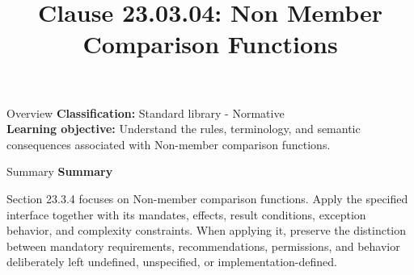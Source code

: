 \documentclass[10pt,letterpaper]{article}
\title{Clause 23.03.04: Non Member Comparison Functions}
\author{}
\date{}
\begin{document}
\maketitle
\begin{CornellOverviewBox}{Overview}
\textbf{Classification:} Standard library - Normative\\[2pt]
\textbf{Learning objective:} Understand the rules, terminology, and semantic consequences associated with Non-member comparison functions.
\end{CornellOverviewBox}\begin{CornellSummaryBox}{Summary}
{\sffamily\bfseries\color{Accent} Summary}\par\vspace{3pt}Section 23.3.4 focuses on Non-member comparison functions. Apply the specified interface together with its mandates, effects, result conditions, exception behavior, and complexity constraints. When applying it, preserve the distinction between mandatory requirements, recommendations, permissions, and behavior deliberately left undefined, unspecified, or implementation-defined.
\end{CornellSummaryBox}
\end{document}
